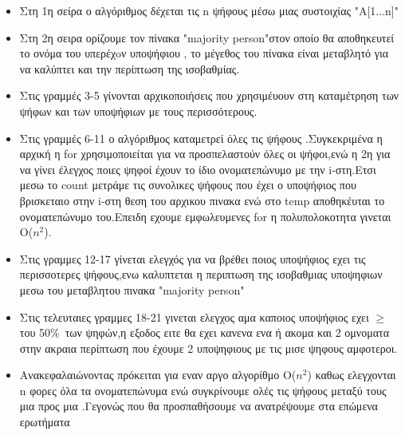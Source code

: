 \documentclass[a4paper]{article}
\begin{document}
\begin{itemize}
    \item Στη 1η σείρα ο αλγόριθμος δέχεται τις n ψήφους μέσω μιας συστοιχίας "A[1...n]"
\end{itemize}
\begin{itemize}
    \item Στη 2η σειρα ορίζουμε τον πίνακα "majority person"στον οποίο θα αποθηκευτεί  το ονόμα του υπερέχoν υποψήφιου , το μέγεθος του πίνακα είναι μεταβλητό για να καλύπτει και την περίπτωση της ισοβαθμίας.
\end{itemize}
\begin{itemize}
    \item Στις γραμμές 3-5 γίνονται αρχικοποιήσεις που χρησιμέυουν στη καταμέτρηση των ψήφων και των υποψήφιων με τους περισσότερους.
\end{itemize}
\begin{itemize}
    \item Στις γραμμές 6-11 ο αλγόριθμος καταμετρεί όλες τις ψήφους .Συγκεκριμένα η αρχική η for χρησιμοποιείται για να προσπελαστούν όλες οι ψήφοι,ενώ η 2η για να γίνει έλεγχος ποιες ψηφοί έχουν το ίδιο ονοματεπώνυμο με την i-στη.Ετσι μεσω το count μετράμε τις συνολικες ψήφους που έχει ο υποψήφιος που βρισκεταιο στην i-στη θεση του αρχικου πινακα ενώ στο temp αποθηκέυται το ονοματεπώνυμο του.Eπειδη εχουμε εμφωλευμενες for η πολυπολοκοτητα γινεται Ο($n^2$).   
\end{itemize}
\begin{itemize}
    \item Στις γραμμες 12-17 γίνεται  ελεγχός για να βρέθει  ποιος υποψήφιος εχει τις περισσοτερες ψήφους,ενω καλυπτεται η περιπτωση της ισοβαθμιας υποψηφιων μεσω του μεταβλητου πινακα "majority person"
\end{itemize}
\begin{itemize}
    \item Στις τελευταιες γραμμες 18-21 γινεται ελεγχος αμα καποιος υποψήφιος εχει $\geq$ του 50\%\ των ψηφών,η εξοδος ειτε θα εχει κανενα ενα ή ακομα και 2 ομνοματα στην ακραια περίπτωση που έχουμε 2 υποψηφιους με τις μισε ψηφους αμφοτεροι.
\end{itemize}
\begin{itemize}
    \item Aνακεφαλαιώνοντας πρόκειται για εναν αργο αλγορίθμο Ο($n^2$) καθως ελεγχονται n φορες όλα τα ονοματεπώνυμα ενώ συγκρίνουμε ολές τις ψήφους μεταξύ τους μια προς μια .Γεγονώς που θα προσπαθήσουμε να ανατρέψουμε στα επώμενα ερωτήματα   
\end{itemize}
\end{document}
